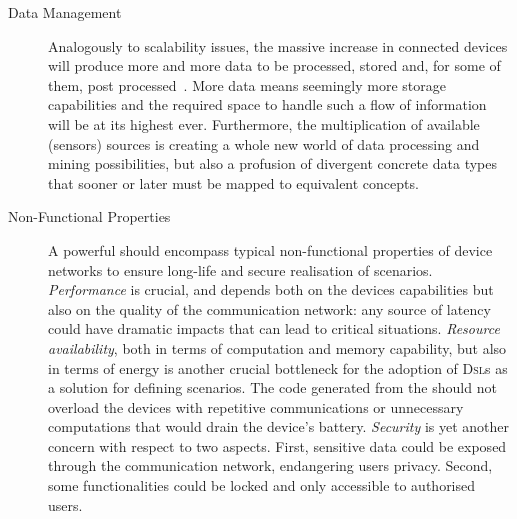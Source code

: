 \begin{description}
	\item[Data Management] Analogously to scalability issues, the massive increase in connected devices will produce more and more data to be processed, stored and, for some of them, post processed~\cite{ma-13,lee-15}. More data means seemingly more storage capabilities and the required space to handle such a flow of information will be at its highest ever. Furthermore, the multiplication of available (sensors) sources is creating a whole new world of data processing and mining possibilities, but also a profusion of divergent concrete data types that sooner or later must be mapped to equivalent concepts.
	
	\item[Non-Functional Properties] A powerful \DSL should encompass typical non-functional properties of device networks to ensure long-life and secure realisation of scenarios. \emph{Performance} is crucial, and depends both on the devices capabilities but also on the quality of the communication network: any source of latency could have dramatic impacts that can lead to critical situations. \emph{Resource availability}, both in terms of computation and memory capability, but also in terms of energy is another crucial bottleneck for the adoption of \textsc{Dsl}s as a solution for defining scenarios. The code generated from the \DSL should not overload the devices with repetitive communications or unnecessary computations that would drain the device's battery. \emph{Security} is yet another concern with respect to two aspects. First, sensitive data could be exposed through the communication network, endangering users privacy. Second, some functionalities could be locked and only accessible to authorised users.

\end{description}

